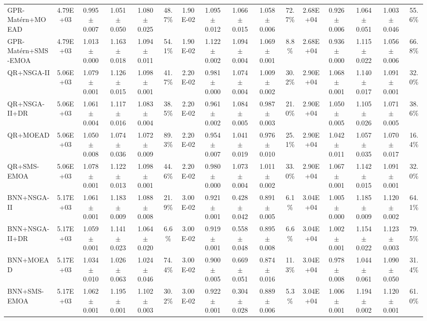 \begin{table}[htbp]
{\begin{tabular}{l c c c c c c c c c c c c c c c}
GPR-Mat\'ern+MOEAD & 4.79E+03 & 0.995$\pm$0.007 & 1.051$\pm$0.050 & 1.080$\pm$0.025 & 48.7\% & 1.90E-02 & 1.095$\pm$0.012 & 1.066$\pm$0.015 & 1.058$\pm$0.006 & 72.7\% & 2.68E+04 & 0.926$\pm$0.006 & 1.064$\pm$0.051 & 1.003$\pm$0.046 & 55.6\% \\
GPR-Mat\'ern+SMS-EMOA & 4.79E+03 & 1.013$\pm$0.000 & 1.163$\pm$0.018 & 1.094$\pm$0.011 & 54.1\% & 1.90E-02 & 1.122$\pm$0.002 & 1.094$\pm$0.004 & 1.069$\pm$0.001 & 8.8\% & 2.68E+04 & 0.936$\pm$0.000 & 1.115$\pm$0.022 & 1.056$\pm$0.006 & 66.8\% \\
QR+NSGA-II & 5.06E+03 & 1.079$\pm$0.001 & 1.126$\pm$0.015 & 1.098$\pm$0.001 & 41.7\% & 2.20E-02 & 0.981$\pm$0.000 & 1.074$\pm$0.004 & 1.009$\pm$0.002 & 30.2\% & 2.90E+04 & 1.068$\pm$0.001 & 1.140$\pm$0.017 & 1.091$\pm$0.001 & 32.0\% \\
QR+NSGA-II+DR & 5.06E+03 & 1.061$\pm$0.004 & 1.117$\pm$0.016 & 1.083$\pm$0.004 & 38.5\% & 2.20E-02 & 0.961$\pm$0.002 & 1.084$\pm$0.005 & 0.987$\pm$0.003 & 21.0\% & 2.90E+04 & 1.050$\pm$0.005 & 1.105$\pm$0.026 & 1.071$\pm$0.005 & 38.6\% \\
QR+MOEAD & 5.06E+03 & 1.050$\pm$0.008 & 1.074$\pm$0.036 & 1.072$\pm$0.009 & 89.3\% & 2.20E-02 & 0.954$\pm$0.007 & 1.041$\pm$0.019 & 0.976$\pm$0.010 & 25.1\% & 2.90E+04 & 1.042$\pm$0.011 & 1.057$\pm$0.035 & 1.070$\pm$0.017 & 16.4\% \\
QR+SMS-EMOA & 5.06E+03 & 1.078$\pm$0.001 & 1.122$\pm$0.013 & 1.098$\pm$0.001 & 44.6\% & 2.20E-02 & 0.980$\pm$0.000 & 1.073$\pm$0.004 & 1.011$\pm$0.002 & 33.0\% & 2.90E+04 & 1.067$\pm$0.001 & 1.142$\pm$0.015 & 1.091$\pm$0.001 & 32.0\% \\
BNN+NSGA-II & 5.17E+03 & 1.061$\pm$0.001 & 1.183$\pm$0.009 & 1.088$\pm$0.008 & 21.9\% & 3.00E-02 & 0.921$\pm$0.001 & 0.428$\pm$0.042 & 0.891$\pm$0.005 & 6.1\% & 3.04E+04 & 1.005$\pm$0.000 & 1.185$\pm$0.009 & 1.120$\pm$0.002 & 64.1\% \\
BNN+NSGA-II+DR & 5.17E+03 & 1.059$\pm$0.001 & 1.141$\pm$0.023 & 1.064$\pm$0.020 & 6.6\% & 3.00E-02 & 0.919$\pm$0.001 & 0.558$\pm$0.048 & 0.895$\pm$0.008 & 6.6\% & 3.04E+04 & 1.002$\pm$0.001 & 1.154$\pm$0.022 & 1.123$\pm$0.003 & 79.5\% \\
BNN+MOEAD & 5.17E+03 & 1.034$\pm$0.010 & 1.026$\pm$0.063 & 1.024$\pm$0.046 & 74.4\% & 3.00E-02 & 0.900$\pm$0.005 & 0.669$\pm$0.051 & 0.874$\pm$0.016 & 11.3\% & 3.04E+04 & 0.978$\pm$0.008 & 1.044$\pm$0.061 & 1.090$\pm$0.050 & 31.4\% \\
BNN+SMS-EMOA & 5.17E+03 & 1.062$\pm$0.001 & 1.195$\pm$0.001 & 1.102$\pm$0.003 & 30.2\% & 3.00E-02 & 0.922$\pm$0.001 & 0.304$\pm$0.028 & 0.889$\pm$0.006 & 5.3\% & 3.04E+04 & 1.006$\pm$0.001 & 1.194$\pm$0.002 & 1.120$\pm$0.001 & 61.0\% \\

\end{tabular}}
\end{table}

